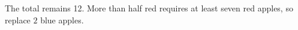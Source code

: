 The total remains 12. More than half red requires at least seven red apples, so replace $\boxed2$ blue apples.
